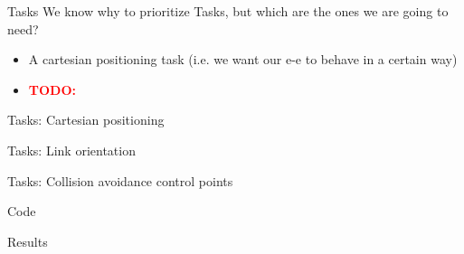 \documentclass[11pt]{beamer}
\newcommand{\todo}{\textcolor{red}{\textbf{TODO:}}}
\begin{document}
\begin{frame}{Tasks}
We know why to prioritize Tasks, but which are the ones we are going to need?
\begin{itemize}
\item A cartesian positioning task (i.e. we want our e-e to behave in a certain way)
\item \todo
\end{itemize}
\end{frame}

\begin{frame}{Tasks: Cartesian positioning}

\end{frame}

\begin{frame}{Tasks: Link orientation}

\end{frame}

\begin{frame}{Tasks: Collision avoidance control points}

\end{frame}

\begin{frame}{Code}

\end{frame}

\begin{frame}{Results}

\end{frame}
\end{document}
